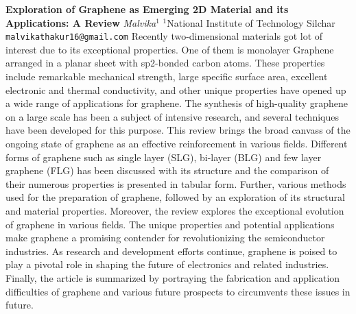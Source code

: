 
    \begin{conf-abstract}[]
        {\textbf{Exploration of Graphene as Emerging 2D Material and its Applications: A Review}}
        {\textit{Malvika$^{1}$}}
        {$^{1}$National Institute of Technology Silchar}
        {\texttt{malvikathakur16@gmail.com}}
        {Recently two-dimensional materials got lot of interest due to its exceptional properties. One of them is monolayer Graphene arranged in a planar sheet with sp2-bonded carbon atoms. These properties include remarkable mechanical strength, large specific surface area, excellent electronic and thermal conductivity, and other unique properties have opened up a wide range of applications for graphene. The synthesis of high-quality graphene on a large scale has been a subject of intensive research, and several techniques have been developed for this purpose. This review brings the broad canvass of the ongoing state of graphene as an effective reinforcement in various fields. Different forms of graphene such as single layer (SLG), bi-layer (BLG) and few layer graphene (FLG) has been discussed with its structure and the comparison of their numerous properties is presented in tabular form. Further, various methods used for the preparation of graphene, followed by an exploration of its structural and material properties. Moreover, the review explores the exceptional evolution of graphene in various fields. The unique properties and potential applications make graphene a promising contender for revolutionizing the semiconductor industries. As research and development efforts continue, graphene is poised to play a pivotal role in shaping the future of electronics and related industries. Finally, the article is summarized by portraying the fabrication and application difficulties of graphene and various future prospects to circumvents these issues in future.}
    \end{conf-abstract}
        